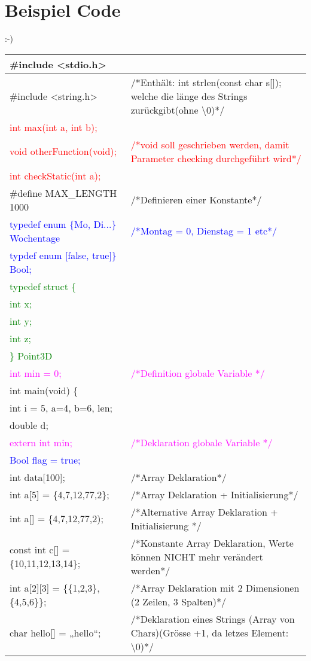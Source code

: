 
\section*{Beispiel Code}

:-)

\begin{tabular}{|l|l|}
\hline 
\#include <stdio.h> & \tabularnewline
\hline 
\#include <string.h> & /{*}Enthält: int strlen(const char s{[}{]}); welche die länge des
Strings zurückgibt(ohne \textbackslash{}0){*}/\tabularnewline
\hline 
\hline 
\textcolor{red}{int max(int a, int b);} & \tabularnewline
\hline 
\textcolor{red}{void otherFunction(void);} & \textcolor{red}{/{*}void soll geschrieben werden, damit Parameter
checking durchgeführt wird{*}/}\tabularnewline
\hline 
\textcolor{red}{int checkStatic(int a);} & \tabularnewline
\hline 
\hline 
\#define MAX\_LENGTH 1000  & /{*}Definieren einer Konstante{*}/\tabularnewline
\hline 
\hline 
\textcolor{blue}{typedef enum \{Mo, Di...\} Wochentage} & \textcolor{blue}{/{*}Montag = 0, Dienstag = 1 etc{*}/}\tabularnewline
\hline 
\textcolor{blue}{typdef enum {[}false, true{]}\} Bool;} & \tabularnewline
\hline 
\hline 
\textcolor{green}{typedef struct \{} & \tabularnewline
\hline 
\textcolor{green}{int x;} & \tabularnewline
\hline 
\textcolor{green}{int y;} & \tabularnewline
\hline 
\textcolor{green}{int z;} & \tabularnewline
\hline 
\textcolor{green}{\} Point3D} & \tabularnewline
\hline 
\hline 
\textcolor{magenta}{int min = 0; } & \textcolor{magenta}{/{*}Definition globale Variable {*}/}\tabularnewline
\hline 
\hline 
int main(void) \{ & \tabularnewline
\hline 
int i = 5, a=4, b=6, len; & \tabularnewline
\hline 
double d; & \tabularnewline
\hline 
\hline 
\textcolor{magenta}{extern int min; } & \textcolor{magenta}{/{*}Deklaration globale Variable {*}/}\tabularnewline
\hline 
\hline 
\textcolor{blue}{Bool flag = true;} & \tabularnewline
\hline 
\hline 
int data{[}100{]}; & /{*}Array Deklaration{*}/\tabularnewline
\hline 
int a{[}5{]} = \{4,7,12,77,2\}; & /{*}Array Deklaration + Initialisierung{*}/\tabularnewline
\hline 
int a{[}{]} = \{4,7,12,77,2);  & /{*}Alternative Array Deklaration + Initialisierung {*}/\tabularnewline
\hline 
const int c{[}{]} = \{10,11,12,13,14\}; & /{*}Konstante Array Deklaration, Werte können NICHT mehr verändert
werden{*}/\tabularnewline
\hline 
int a{[}2{]}{[}3{]} = \{\{1,2,3\},\{4,5,6\}\}; & /{*}Array Deklaration mit 2 Dimensionen (2 Zeilen, 3 Spalten){*}/\tabularnewline
\hline 
char hello{[}{]} = „hello“;  & /{*}Deklaration eines Strings (Array von Chars)(Grösse +1, da letzes
Element: \textbackslash{}0){*}/\tabularnewline

\end{tabular}
